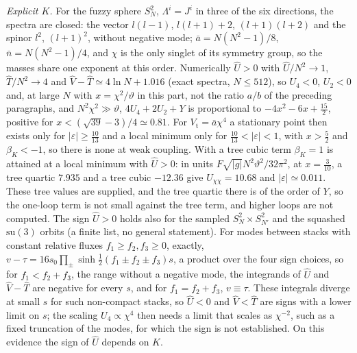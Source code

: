 \emph{Explicit \(K\).} For the fuzzy sphere \(S^2_N\), \(\Lambda^i=J^i\) in three of the six directions, the spectra are closed: the vector \(l(l-1)\), \(l(l+1)+2\), \((l+1)(l+2)\) and the spinor \(l^2\), \((l+1)^2\), without negative mode; \(\bar a=N(N^2-1)/8\), \(\bar n=N(N^2-1)/4\), and \(\chi\) is the only singlet of its symmetry group, so the masses share one exponent at this order. Numerically \(\hat U>0\) with \(\hat U/N^2\to1\), \(\hat T/N^2\to4\) and \(\hat V-\hat T\simeq4\ln N+1.016\) (exact spectra, \(N\le512\)), so \(U_4<0\), \(U_2<0\) and, at large \(N\) with \(x=\chi^2/\vartheta\) in this part, not the ratio \(a/b\) of the preceding paragraphs, and \(N^2\chi^2\gg\vartheta\), \(4U_4+2U_2+Y\) is proportional to \(-4x^2-6x+\tfrac{15}2\), positive for \(x<(\sqrt{39}-3)/4\simeq0.81\). For \(V_{\mathrm t}=\bar a\chi^4\) a stationary point then exists only for \(|\varepsilon|\ge\tfrac{10}{13}\) and a local minimum only for \(\tfrac{10}{13}<|\varepsilon|<1\), with \(x>\tfrac52\) and \(\beta_K<-1\), so there is none at weak coupling. With a tree cubic term \(\beta_K=1\) is attained at a local minimum with \(\hat U>0\): in units \(F\sqrt{|g|}N^2\vartheta^2/32\pi^2\), at \(x=\tfrac3{10}\), a tree quartic \(7.935\) and a tree cubic \(-12.36\) give \(U_{\chi\chi}=10.68\) and \(|\varepsilon|\simeq0.011\). These tree values are supplied, and the tree quartic there is of the order of \(Y\), so the one-loop term is not small against the tree term, and higher loops are not computed. The sign \(\hat U>0\) holds also for the sampled \(S^2_N\times S^2_{N'}\) and the squashed \(\mathrm{su}(3)\) orbits (a finite list, no general statement). For modes between stacks with constant relative fluxes \(f_1\ge f_2,f_3\ge0\), exactly, \(v-\tau=16s_0\prod_\pm\sinh\tfrac12(f_1\pm f_2\pm f_3)s\), a product over the four sign choices, so for \(f_1<f_2+f_3\), the range without a negative mode, the integrands of \(\hat U\) and \(\hat V-\hat T\) are negative for every \(s\), and for \(f_1=f_2+f_3\), \(v\equiv\tau\). These integrals diverge at small \(s\) for such non-compact stacks, so \(\hat U<0\) and \(\hat V<\hat T\) are signs with a lower limit on \(s\); the scaling \(U_4\propto\chi^4\) then needs a limit that scales as \(\chi^{-2}\), such as a fixed truncation of the modes, for which the sign is not established. On this evidence the sign of \(\hat U\) depends on \(K\).

